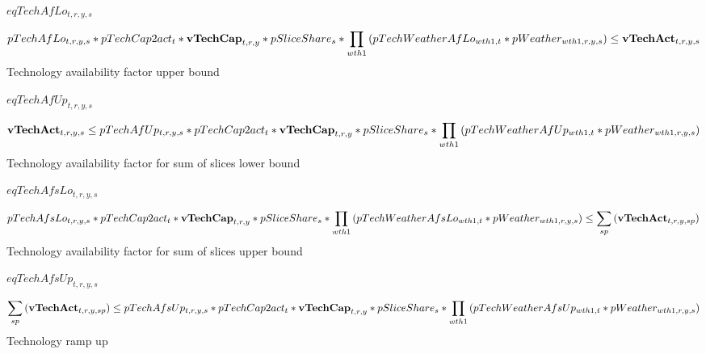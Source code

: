 \documentclass{article}
\begin{document}
$eqTechAfLo_{t,r,y,s}$





\begin{dmath}
pTechAfLo_{t,r,y,s}*pTechCap2act_{t}*{\bf vTechCap}_{t,r,y}*pSliceShare_{s}*\prod_{wth1}{\left(pTechWeatherAfLo_{wth1,t}*pWeather_{wth1,r,y,s}\right)}  \le  {\bf vTechAct}_{t,r,y,s}
\end{dmath}
Technology availability factor upper bound







$eqTechAfUp_{t,r,y,s}$





\begin{dmath}
{\bf vTechAct}_{t,r,y,s}  \le  pTechAfUp_{t,r,y,s}*pTechCap2act_{t}*{\bf vTechCap}_{t,r,y}*pSliceShare_{s}*\prod_{wth1}{\left(pTechWeatherAfUp_{wth1,t}*pWeather_{wth1,r,y,s}\right)}
\end{dmath}
Technology availability factor for sum of slices lower bound







$eqTechAfsLo_{t,r,y,s}$





\begin{dmath}
pTechAfsLo_{t,r,y,s}*pTechCap2act_{t}*{\bf vTechCap}_{t,r,y}*pSliceShare_{s}*\prod_{wth1}{\left(pTechWeatherAfsLo_{wth1,t}*pWeather_{wth1,r,y,s}\right)}  \le  \sum_{sp}{\left({\bf vTechAct}_{t,r,y,sp}\right)}
\end{dmath}
Technology availability factor for sum of slices upper bound







$eqTechAfsUp_{t,r,y,s}$





\begin{dmath}
\sum_{sp}{\left({\bf vTechAct}_{t,r,y,sp}\right)}  \le  pTechAfsUp_{t,r,y,s}*pTechCap2act_{t}*{\bf vTechCap}_{t,r,y}*pSliceShare_{s}*\prod_{wth1}{\left(pTechWeatherAfsUp_{wth1,t}*pWeather_{wth1,r,y,s}\right)}
\end{dmath}
Technology ramp up
\end{document}
